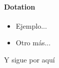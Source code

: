 \paragraph{Dotation}
\begin{itemize}
    \item Ejemplo...
    \item Otro más...
\end{itemize}
Y sigue por aquí
